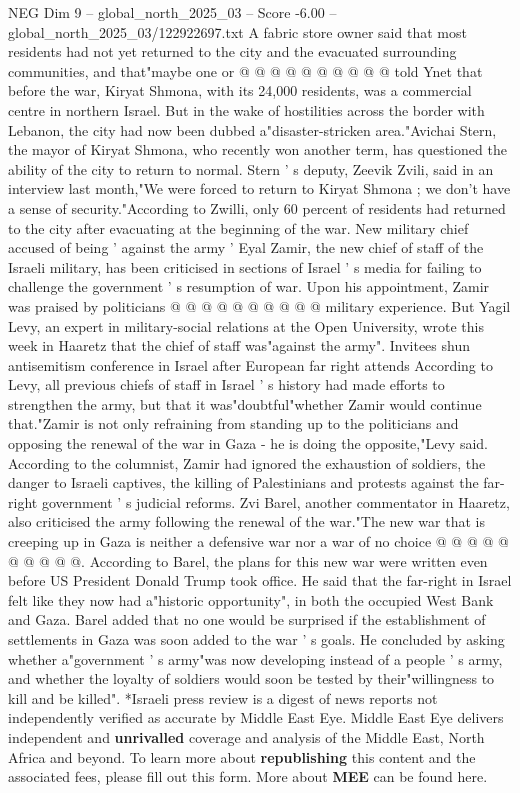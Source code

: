 \begin{textsample}{NEG Dim 9 – global\_north\_2025\_03 – Score -6.00 – global\_north\_2025\_03/122922697.txt}
A fabric store owner said that most residents had not yet returned to the city and the evacuated surrounding communities, and that"maybe one or @ @ @ @ @ @ @ @ @ @ told Ynet that before the war, Kiryat Shmona, with its 24,000 residents, was a commercial centre in northern Israel.
But in the wake of hostilities across the border with Lebanon, the city had now been dubbed a"disaster-stricken area."Avichai Stern, the mayor of Kiryat Shmona, who recently won another term, has questioned the ability of the city to return to normal.
Stern ' s deputy, Zeevik Zvili, said in an interview last month,"We were forced to return to Kiryat Shmona ; we don't have a sense of security."According to Zwilli, only 60 percent of residents had returned to the city after evacuating at the beginning of the war.
New military chief accused of being ' against the army ' Eyal Zamir, the new chief of staff of the Israeli military, has been criticised in sections of Israel ' s media for failing to challenge the government ' s resumption of war.
Upon his appointment, Zamir was praised by politicians @ @ @ @ @ @ @ @ @ @ military experience.
But Yagil Levy, an expert in military-social relations at the Open University, wrote this week in Haaretz that the chief of staff was"against the army".
Invitees shun antisemitism conference in Israel after European far right attends According to Levy, all previous chiefs of staff in Israel ' s history had made efforts to strengthen the army, but that it was"doubtful"whether Zamir would continue that."Zamir is not only refraining from standing up to the politicians and opposing the renewal of the war in Gaza - he is doing the opposite,"Levy said.
According to the columnist, Zamir had ignored the exhaustion of soldiers, the danger to Israeli captives, the killing of Palestinians and protests against the far-right government ' s judicial reforms.
Zvi Barel, another commentator in Haaretz, also criticised the army following the renewal of the war."The new war that is creeping up in Gaza is neither a defensive war nor a war of no choice @ @ @ @ @ @ @ @ @ @.
According to Barel, the plans for this new war were written even before US President Donald Trump took office.
He said that the far-right in Israel felt like they now had a"historic opportunity", in both the occupied West Bank and Gaza.
Barel added that no one would be surprised if the establishment of settlements in Gaza was soon added to the war ' s goals.
He concluded by asking whether a"government ' s army"was now developing instead of a people ' s army, and whether the loyalty of soldiers would soon be tested by their"willingness to kill and be killed". *Israeli press review is a digest of news reports not independently verified as accurate by Middle East Eye.
Middle East Eye delivers independent and \textbf{unrivalled} coverage and analysis of the Middle East, North Africa and beyond.
To learn more about \textbf{republishing} this content and the associated fees, please fill out this form.
More about \textbf{MEE} can be found here.

\end{textsample}
